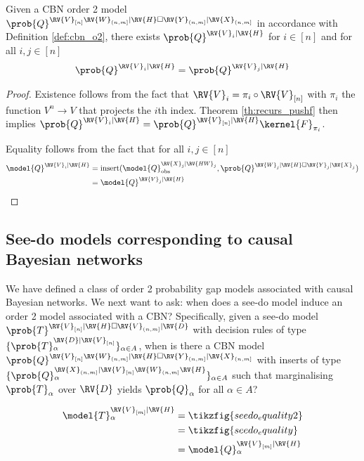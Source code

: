 \begin{theorem}
Given a CBN order 2 model $\prob{Q}^{\RV{V}_{[n]}\RV{W}_{(n,m]}|\RV{H}\square \RV{Y}_{(n,m]}|\RV{X}_{(n,m]}}$ in accordance with Definition \ref{def:cbn_o2}, there exists $\prob{Q}^{\RV{V}_{i}|\RV{H}}$ for $i\in [n]$ and for all $i,j\in [n]$
\begin{align}
    \prob{Q}^{\RV{V}_i|\RV{H}} = \prob{Q}^{\RV{V}_j|\RV{H}}\label{eq:identical_3}
\end{align}
\end{theorem}

\begin{proof}
Existence follows from the fact that $\RV{V}_i=\pi_i\circ\RV{V}_{[n]}$ with $\pi_i$ the function $V^n\to V$ that projects the $i$th index. Theorem \ref{th:recurs_pushf} then implies $\prob{Q}^{\RV{V}_i|\RV{H}}=\prob{Q}^{\RV{V}_{[n]}|\RV{H}}\kernel{F}_{\pi_i}$.

Equality follows from the fact that for all $i,j\in[n]$
\begin{align}
    \model{Q}^{\RV{V}_i|\RV{H}} &= \text{insert}(\model{Q}_{\text{obs}}^{\RV{X}_{j}|\RV{HW}_{j}},\prob{Q}^{\RV{W}_{j}|\RV{H}\square\RV{Y}_{j}|\RV{X}_{j}})\\
    &= \model{Q}^{\RV{V}_j|\RV{H}}
\end{align}
\end{proof}

\subsection{See-do models corresponding to causal Bayesian networks}

We have defined a class of order 2 probability gap models associated with causal Bayesian networks. We next want to ask: when does a see-do model induce an order 2 model associated with a CBN? Specifically, given a see-do model $\prob{T}^{\RV{V}_{[n]}|\RV{H}\square \RV{V}_{(n,m]}|\RV{D}}$ with decision rules of type $\{\prob{T}_\alpha^{\RV{D}|\RV{V}_{[n]}}\}_{\alpha\in A}$, when is there a CBN model $\prob{Q}^{\RV{V}_{[n]}\RV{W}_{(n,m]}|\RV{H}\square \RV{Y}_{(n,m]}|\RV{X}_{(n,m]}}$ with inserts of type $\{\prob{Q}_\alpha^{\RV{X}_{(n,m]}|\RV{V}_{[n]}\RV{W}_{(n,m]}\RV{H}}\}_{\alpha\in A}$ such that marginalising $\prob{T}_\alpha$ over $\RV{D}$ yields $\prob{Q}_\alpha$ for all $\alpha\in A$?

\begin{align}
    \model{T}^{\RV{V}_{[m]}|\RV{H}}_\alpha&=\tikzfig{seedo_equality2}\\
    &=\tikzfig{seedo_equality} \label{eq:consistent}\\
    &= \model{Q}^{\RV{V}_{[m]}|\RV{H}}_\alpha
\end{align}

